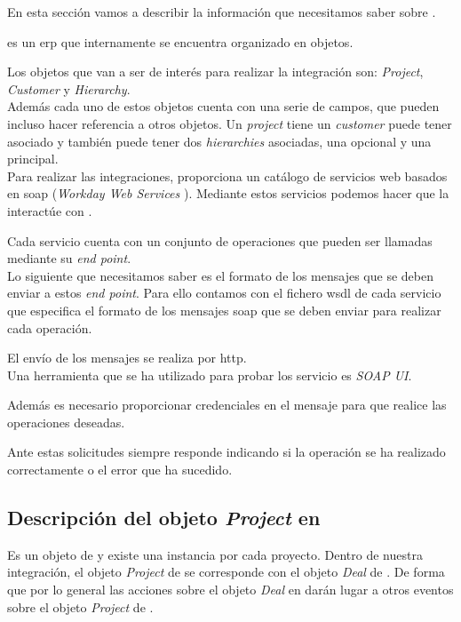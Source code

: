 En esta sección vamos a describir la información que necesitamos saber sobre \wday.

\wday{} es un \acrshort{erp} que internamente se encuentra organizado en objetos.
 
Los objetos que van a ser de interés para realizar la integración son:
\textit{Project}, \textit{Customer} y \textit{Hierarchy}.\\

Además cada uno de estos objetos cuenta con una serie de campos, que pueden incluso hacer referencia a otros objetos.
Un \textit{project} tiene un \textit{customer} puede tener asociado y también puede tener dos \textit{hierarchies} asociadas, una opcional y una principal.\\


Para realizar las integraciones, \wday{} proporciona un catálogo de servicios web basados en \acrshort{soap} (\textit{Workday Web Services} \cite{wws}). 
Mediante estos servicios podemos hacer que la \iface{} interactúe con \wday{}.

Cada servicio cuenta con un conjunto de operaciones que pueden ser llamadas mediante su \textit{end point}.\\


Lo siguiente que necesitamos saber es el formato de los mensajes que se deben enviar a estos \textit{end point}. Para ello contamos con el fichero \acrshort{wsdl} de cada servicio que especifica el formato de los mensajes \acrshort{soap} que se deben enviar para realizar cada operación.


El envío de los mensajes se realiza por \acrshort{http}.\\

Una herramienta que se ha utilizado para probar los servicio es \textit{SOAP UI}.

Además es necesario proporcionar credenciales en el mensaje para que \wday{} realice las operaciones deseadas.

Ante estas solicitudes \wday{} siempre responde indicando si la operación se ha realizado correctamente o el error que ha sucedido.



\subsection{Descripción del objeto \textit{Project} en \wday{}}
Es un objeto de \wday{} y existe una instancia por cada proyecto. Dentro de nuestra integración, 
el objeto \textit{Project} de \wday{} se corresponde con el objeto \textit{Deal} de \hs{}. 
De forma que por lo general las acciones sobre el objeto \textit{Deal} en \hs{} darán lugar a otros eventos
 sobre el objeto \textit{Project} de \wday{}.\\
 
